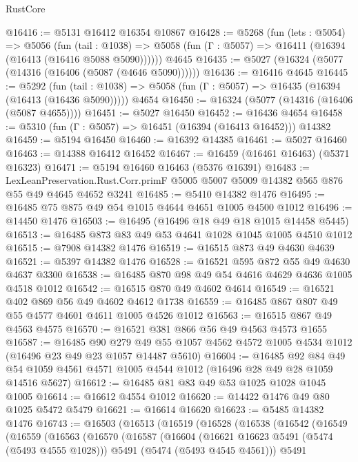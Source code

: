\begin{lexlean}{RustCore}
\begin{coremodule}
@16416 := @5131 @16412 @16354 @10867
@16428 := @5268
    (fun (lets : @5054) =>
    @5056
      (fun (tail : @1038) =>
      @5058 (fun (Γ : @5057) => @16411 (@16394 (@16413 (@16416 @5088 @5090))))))
    @4645
@16435 := @5027 (@16324 (@5077 (@14316 (@16406 (@5087 (@4646 @5090))))))
@16436 := @16416 @4645
@16445 := @5292
    (fun (tail : @1038) => @5058 (fun (Γ : @5057) => @16435 (@16394 (@16413 (@16436 @5090)))))
    @4654
@16450 := @16324 (@5077 (@14316 (@16406 (@5087 @4655))))
@16451 := @5027 @16450
@16452 := @16436 @4654
@16458 := @5310 (fun (Γ : @5057) => @16451 (@16394 (@16413 @16452))) @14382
@16459 := @5194 @16450
@16460 := @16392 @14385
@16461 := @5027 @16460
@16463 := @14388 @16412 @16452
@16467 := @16459 (@16461 @16463) (@5371 @16323)
@16471 := @5194 @16460 @16463 (@5376 @16391)
@16483 := LexLeanPreservation.Rust.Corr.primF
    @5005
    @5007
    @5009
    @14382
    @565
    @876
    @55
    @49
    @4645
    @4652
    @3241
@16485 := @5410 @14382 @1476
@16495 := @16485 @75 @875 @49 @54 @1015 @4644 @4651 @1005 @4500 @1012
@16496 := @14450 @1476
@16503 := @16495 (@16496 @18 @49 @18 @1015 @14458 @5445)
@16513 := @16485 @873 @83 @49 @53 @4641 @1028 @1045 @1005 @4510 @1012
@16515 := @7908 @14382 @1476
@16519 := @16515 @873 @49 @4630 @4639
@16521 := @5397 @14382 @1476
@16528 := @16521 @595 @872 @55 @49 @4630 @4637 @3300
@16538 := @16485 @870 @98 @49 @54 @4616 @4629 @4636 @1005 @4518 @1012
@16542 := @16515 @870 @49 @4602 @4614
@16549 := @16521 @402 @869 @56 @49 @4602 @4612 @1738
@16559 := @16485 @867 @807 @49 @55 @4577 @4601 @4611 @1005 @4526 @1012
@16563 := @16515 @867 @49 @4563 @4575
@16570 := @16521 @381 @866 @56 @49 @4563 @4573 @1655
@16587 := @16485
    @90
    @279
    @49
    @55
    @1057
    @4562
    @4572
    @1005
    @4534
    @1012
    (@16496 @23 @49 @23 @1057 @14487 @5610)
@16604 := @16485
    @92
    @84
    @49
    @54
    @1059
    @4561
    @4571
    @1005
    @4544
    @1012
    (@16496 @28 @49 @28 @1059 @14516 @5627)
@16612 := @16485 @81 @83 @49 @53 @1025 @1028 @1045 @1005
@16614 := @16612 @4554 @1012
@16620 := @14422 @1476 @49 @80 @1025 @5472 @5479
@16621 := @16614 @16620
@16623 := @5485 @14382 @1476
@16743 := @16503
    (@16513
      (@16519
        (@16528
          (@16538
            (@16542
              (@16549
                (@16559
                  (@16563
                    (@16570
                      (@16587
                        (@16604
                          (@16621 @16623 @5491 (@5474 (@5493 @4555 @1028)))
                          @5491
                          (@5474 (@5493 @4545 @4561)))
                        @5491

\end{coremodule}
\end{lexlean}

